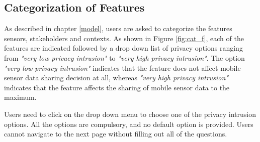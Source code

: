 \subsection{Categorization of Features} \label{cat_feature}

As described in chapter \ref{model}, users are asked to categorize the features sensors, stakeholders and contexts. As shown in Figure 
\ref{fig:cat_f}, each of the features are indicated followed by a drop down list of privacy options ranging from \textit{"very low privacy intrusion"} to \textit{"very high privacy intrusion"}. The option \textit{"very low privacy intrusion"} indicates that the feature does not affect mobile sensor data sharing decision at all, whereas 
\textit{"very high privacy intrusion"} indicates that the feature affects the sharing of mobile sensor data to the maximum. 

Users need to click on the
drop down menu to choose one of the privacy intrusion options. All the options are compulsory, and no default option is provided. Users cannot navigate to the next page without filling out all of the questions.

